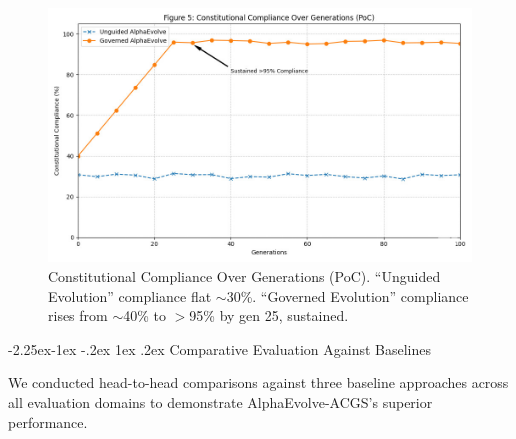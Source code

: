 \documentclass[manuscript,screen,review,anonymous,9pt]{acmart}
\makeatletter
\renewcommand\subsection{\@startsection{subsection}{2}{\z@}%
  {-2.25ex\@plus -1ex \@minus -.2ex}%
  {1ex \@plus .2ex}%
  {\normalfont\large\bfseries}}
\makeatother
\begin{document}
\begin{figure}[htbp]
  \centering
  \includegraphics[width=0.9\columnwidth,height=0.25\textheight,keepaspectratio]{fig5_compliance_generations.png}
  \caption[Constitutional compliance over generations line chart]{Constitutional Compliance Over Generations (PoC). ``Unguided Evolution'' compliance flat $\sim$30\%. ``Governed Evolution'' compliance rises from $\sim$40\% to $>$95\% by gen 25, sustained.}
  \label{fig:compliance_over_generations}
\end{figure}

\subsection{Comparative Evaluation Against Baselines}
\label{subsec:comparative_evaluation}

We conducted head-to-head comparisons against three baseline approaches across all evaluation domains to demonstrate AlphaEvolve-ACGS's superior performance.
\end{document}
